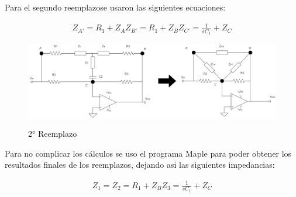 Para el segundo reemplazose usaron las siguientes ecuaciones:

\begin{align}

	\begin{equation}
		Z_{A'}= R_1 + Z_{A}
	\end{equation}

	\begin{equation}
		Z_{B'}= R_1 + Z_{B}
	\end{equation}
	
	\begin{equation}
		Z_{C'}= \frac{1}{sC_1} + Z_{C}
	\end{equation}

\end{align}

\begin{figure}[h]
	\caption{2° Reemplazo}
	\centering
	\includegraphics[scale=0.6]{../Ejercicio4-EcualizadorDeFase/Informe/2cambioTriangulo.png}
	\label{2reemplazo} 
\end{figure}


Para no complicar los cálculos se uso el programa Maple para poder obtener los resultados finales de los reemplazos, dejando asi las siguientes impedancias:

\begin{align}

	\begin{equation}
		Z_{1}= 
	\end{equation}

	\begin{equation}
		Z_{2}= R_1 + Z_{B}
	\end{equation}
	
	\begin{equation}
		Z_{3}= \frac{1}{sC_1} + Z_{C}
	\end{equation}

\end{align}




